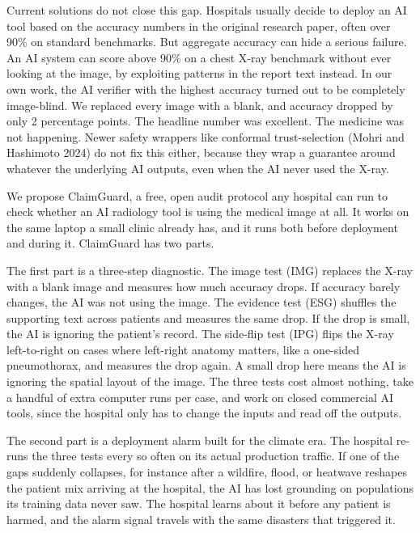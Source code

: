 \documentclass[12pt,letterpaper]{article}
\begin{document}
Current solutions do not close this gap. Hospitals usually decide to deploy an AI tool based on the accuracy numbers in the original research paper, often over 90\% on standard benchmarks. But aggregate accuracy can hide a serious failure. An AI system can score above 90\% on a chest X-ray benchmark without ever looking at the image, by exploiting patterns in the report text instead. In our own work, the AI verifier with the highest accuracy turned out to be completely image-blind. We replaced every image with a blank, and accuracy dropped by only 2 percentage points. The headline number was excellent. The medicine was not happening. Newer safety wrappers like conformal trust-selection (Mohri and Hashimoto 2024) do not fix this either, because they wrap a guarantee around whatever the underlying AI outputs, even when the AI never used the X-ray.

We propose ClaimGuard, a free, open audit protocol any hospital can run to check whether an AI radiology tool is using the medical image at all. It works on the same laptop a small clinic already has, and it runs both before deployment and during it. ClaimGuard has two parts.

The first part is a three-step diagnostic. The image test (IMG) replaces the X-ray with a blank image and measures how much accuracy drops. If accuracy barely changes, the AI was not using the image. The evidence test (ESG) shuffles the supporting text across patients and measures the same drop. If the drop is small, the AI is ignoring the patient's record. The side-flip test (IPG) flips the X-ray left-to-right on cases where left-right anatomy matters, like a one-sided pneumothorax, and measures the drop again. A small drop here means the AI is ignoring the spatial layout of the image. The three tests cost almost nothing, take a handful of extra computer runs per case, and work on closed commercial AI tools, since the hospital only has to change the inputs and read off the outputs.

The second part is a deployment alarm built for the climate era. The hospital re-runs the three tests every so often on its actual production traffic. If one of the gaps suddenly collapses, for instance after a wildfire, flood, or heatwave reshapes the patient mix arriving at the hospital, the AI has lost grounding on populations its training data never saw. The hospital learns about it before any patient is harmed, and the alarm signal travels with the same disasters that triggered it.
\end{document}
